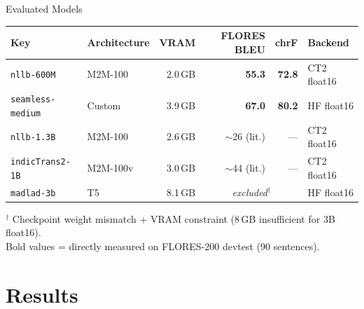 \documentclass[aspectratio=169,10pt]{beamer}
\begin{document}
\begin{frame}{Evaluated Models}
  \begin{table}
  \small
  \begin{tabular}{llrrrl}
    \toprule
    Key & Architecture & VRAM & FLORES BLEU & chrF & Backend \\
    \midrule
    \texttt{nllb-600M}       & M2M-100   & 2.0\,GB & \textbf{55.3} & \textbf{72.8} & CT2 float16 \\
    \texttt{seamless-medium} & Custom    & 3.9\,GB & \textbf{67.0} & \textbf{80.2} & HF float16  \\
    \texttt{nllb-1.3B}       & M2M-100   & 2.6\,GB & $\sim$26 (lit.) & --- & CT2 float16 \\
    \texttt{indicTrans2-1B}  & M2M-100v  & 3.0\,GB & $\sim$44 (lit.) & --- & CT2 float16 \\
    \midrule
    \texttt{madlad-3b}       & T5        & 8.1\,GB & \multicolumn{2}{c}{\textit{excluded$^\dagger$}} & HF float16  \\
    \bottomrule
  \end{tabular}
  \end{table}
  \vspace{0.1cm}
  \footnotesize $^\dagger$ Checkpoint weight mismatch + VRAM constraint (8\,GB insufficient for 3B float16).\\
  Bold values = directly measured on FLORES-200 devtest (90 sentences).
\end{frame}

\section{Results}
\end{document}
